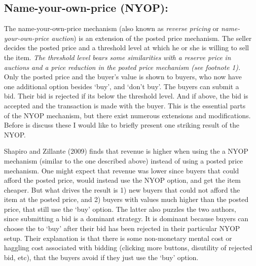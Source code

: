 \documentclass[a4paper,12pt]{article}
\begin{document}
	\subsection{Name-your-own-price (NYOP):}

	The name-your-own-price mechanism (also known as {\it reverse pricing} or {\it name-your-own-price auction}) is an extension of the posted price mechanism. The seller decides the posted price and a threshold level at which he or she is willing to sell the item. {\it The threshold level bears some similarities with a reserve price in auctions and a price reduction in the posted price mechanism (see footnote 1).} Only the posted price and the buyer's value is shown to buyers, who now have one additional option besides `buy', and `don't buy'. The buyers can submit a bid. Their bid is rejected if its below the threshold level. And if above, the bid is accepted and the transaction is made with the buyer. This is the essential parts of the NYOP mechanism, but there exist numerous extensions and modifications. Before is discuss these I would like to briefly present one striking result of the NYOP.

	Shapiro and Zillante (2009) finds that revenue is higher when using the a NYOP mechanism (similar to the one described above) instead of using a posted price mechanism. One might expect that revenue was lower since buyers that could afford the posted price, would instead use the NYOP option, and get the item cheaper. But what drives the result is 1) new buyers that could not afford the item at the posted price, and 2) buyers with values much higher than the posted price, that still use the `buy' option. The latter also puzzles the two authors, since submitting a bid is a dominant strategy. It is dominant because buyers can choose the to `buy' after their bid has been rejected in their particular NYOP setup. Their explanation is that there is some non-monetary mental cost or haggling cost associated with bidding (clicking more buttons, disutility of rejected bid, etc), that the buyers avoid if they just use the `buy' option.
\end{document}
